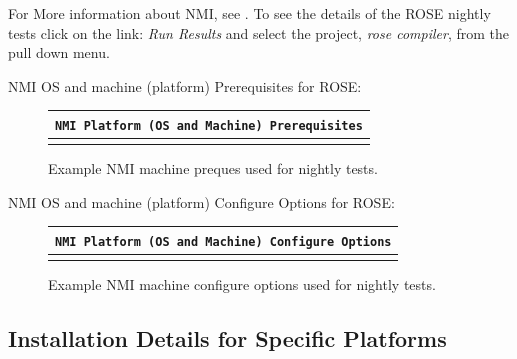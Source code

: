 For More information about NMI, see
.
To see the details of the ROSE nightly tests click on the link: {\em Run Results}
and select the project, {\em rose compiler}, from the pull down menu.


   NMI OS and machine (platform) Prerequisites for ROSE:
{\indent
\begin{latexonly}
\begin{figure}[tb]
\begin{center}
\begin{tabular}{|c|} \hline
     {\tt NMI Platform (OS and Machine) Prerequisites}
\\\hline\hline
{
\scriptsize
   
}
\\\hline
\end{tabular}
\end{center}
\caption{ Example NMI machine preques used for nightly tests. }
\end{figure}
\end{latexonly}
\label{NMI:prerequisites}
}

   NMI OS and machine (platform) Configure Options for ROSE:
{\indent
\begin{latexonly}
\begin{figure}[tb]
\begin{center}
\begin{tabular}{|c|} \hline
     {\tt NMI Platform (OS and Machine) Configure Options}
\\\hline\hline
{
\scriptsize
   
}
\\\hline
\end{tabular}
\end{center}
\caption{ Example NMI machine configure options used for nightly tests. }
\end{figure}
\end{latexonly}
\label{NMI:configureOptions}
}

\subsection{Installation Details for Specific Platforms}

